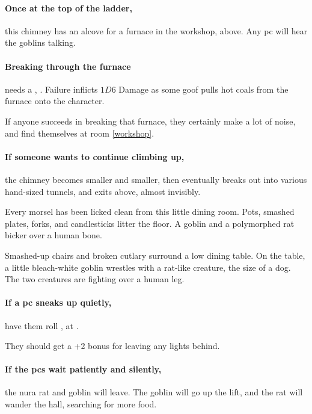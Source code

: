 \begin{multicols}{2}
\paragraph{Once at the top of the ladder,}
this chimney has an alcove for a furnace in the workshop, above.
Any \gls{pc} will hear the goblins talking.

\paragraph{Breaking through the furnace}
needs a , \tn[6].
Failure inflicts $1D6$ Damage as some goof pulls hot coals from the furnace onto the character.

If anyone succeeds in breaking that furnace, they certainly make a lot of noise, and find themselves at room \ref{workshop}.

\paragraph{If someone wants to continue climbing up,}
the chimney becomes smaller and smaller, then eventually breaks out into various hand-sized tunnels, and exits above, almost invisibly.


Every morsel has been licked clean from this little dining room.
Pots, smashed plates, forks, and candlesticks litter the floor.
A goblin and a polymorphed rat bicker over a human bone.

\begin{boxtext}

  Smashed-up chairs and broken cutlary surround a low dining table.
  On the table, a little bleach-white goblin wrestles with a rat-like creature, the size of a dog.
  The two creatures are fighting over a human leg.

\end{boxtext}

\paragraph{If a \gls{pc} sneaks up quietly,}
have them roll ,  at \tn[9].

They should get a +2 bonus for leaving any lights behind.

\paragraph{If the \glspl{pc} wait patiently and silently,}
the nura rat and goblin will leave.
The goblin will go up the lift, and the rat will wander the hall, searching for more food.


\end{multicols}
